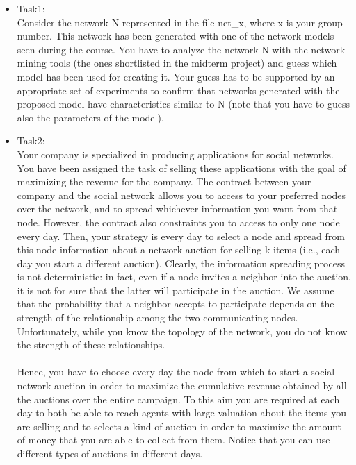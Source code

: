 \documentclass[conference]{IEEEtran}
\begin{document}
\begin{itemize}
    \item Task1:\\ Consider the network N represented in the file net\_x, where x is your group number.
    This network has been generated with one of the network models seen during the course.
    You have to analyze the network N with the network mining tools (the ones shortlisted in the
    midterm project) and guess which model has been used for creating it. Your guess has to be
    supported by an appropriate set of experiments to confirm that networks generated with the
    proposed model have characteristics similar to N (note that you have to guess also the parameters of
    the model). \\

    \item Task2:\\ Your company is specialized in producing applications for social networks. You have been assigned
    the task of selling these applications with the goal of maximizing the revenue for the company. The
    contract between your company and the social network allows you to access to your preferred nodes
    over the network, and to spread whichever information you want from that node. However, the
    contract also constraints you to access to only one node every day. Then, your strategy is every day
    to select a node and spread from this node information about a network auction for selling k items
    (i.e., each day you start a different auction). Clearly, the information spreading process is not
    deterministic: in fact, even if a node invites a neighbor into the auction, it is not for sure that the
    latter will participate in the auction. We assume that the probability that a neighbor accepts to
    participate depends on the strength of the relationship among the two communicating nodes.
    Unfortunately, while you know the topology of the network, you do not know the strength of these
    relationships.\\ \\
    Hence, you have to choose every day the node from which to start a social network auction in order
    to maximize the cumulative revenue obtained by all the auctions over the entire campaign. To this
    aim you are required at each day to both be able to reach agents with large valuation about the items
    you are selling and to selects a kind of auction in order to maximize the amount of money that you
    are able to collect from them. Notice that you can use different types of auctions in different days.

\end{itemize}
\end{document}
